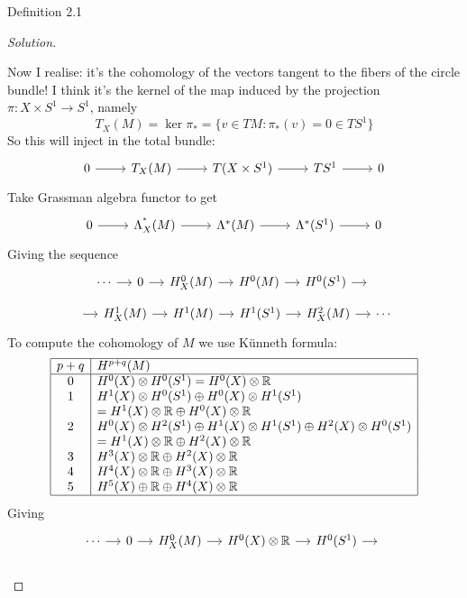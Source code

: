 \begin{thing3}{Definition 2.1}
\begin{proof}[Solution]
\begin{enumerate}
Now I realise: it's the cohomology of the vectors tangent to the fibers of the circle bundle! I think it's the kernel of the map induced by the projection \(\pi:X \times S^1 \to S^1\), namely
\[T_X(M)=\ker \pi_*=\{v \in TM: \pi_*(v)=0\in TS^1\}\]
So this will inject in the total bundle:
\[\begin{tikzcd}0\arrow[r]&T_X(M)\arrow[r]&T(X \times S^1)\arrow[r]&TS^1\arrow[r]&0\end{tikzcd}\]
Take Grassman algebra functor to get
\[\begin{tikzcd}0\arrow[r]&\Lambda^{^*}_X(M)\arrow[r]&\Lambda^{*}(M)\arrow[r]&\Lambda^{*}(S^1)\arrow[r]&0\end{tikzcd}\]
Giving the sequence
\[\begin{tikzcd}[column sep=small]
	\cdots\arrow[r]&0\arrow[r]&H^{0}_X(M)\arrow[r]&H^{0}(M)\arrow[r]&H^{0}(S^1)\arrow[r]&\leavevmode
\end{tikzcd}\]
\[\begin{tikzcd}[column sep=small]
	\leavevmode\arrow[r]&H^{1}_X(M)\arrow[r]&H^{1}(M)\arrow[r]&H^{1}(S^1)\arrow[r]&H^{2}_X(M)\arrow[r]&\cdots
\end{tikzcd}\]
To compute the cohomology of \(M\) we use Künneth formula:
\[
\begin{array}{|c|l|}
\hline
p+q & H^{p+q}(M) \\
\hline
0 & H^0(X) \otimes H^0(S^1) = H^0(X) \otimes \mathbb{R} \\
1 & H^1(X) \otimes H^0(S^1) \oplus H^0(X) \otimes H^1(S^1) \\
  & = H^1(X) \otimes \mathbb{R} \oplus H^0(X) \otimes \mathbb{R} \\
2 & H^0(X) \otimes H^2(S^1) \oplus H^1(X) \otimes H^1(S^1) \oplus H^2(X) \otimes H^0(S^1) \\
  & = H^1(X) \otimes \mathbb{R} \oplus H^2(X) \otimes \mathbb{R} \\
3 & H^3(X) \otimes \mathbb{R} \oplus H^2(X) \otimes \mathbb{R} \\
4 & H^4(X) \otimes \mathbb{R} \oplus H^3(X) \otimes \mathbb{R} \\
5 & H^5(X) \oplus \mathbb{R} \oplus H^4(X) \otimes \mathbb{R} \\
\hline
\end{array}
\]
Giving
\[\begin{tikzcd}[column sep=small]
	\cdots\arrow[r]&0\arrow[r]&H^{0}_X(M)\arrow[r]&H^{0}(X) \otimes \mathbb{R}\arrow[r]&H^{0}(S^1)\arrow[r]&\leavevmode
\end{tikzcd}\]
\[\begin{tikzcd}[column sep=small]

\end{tikzcd}\]
\end{enumerate}
\end{proof}
\end{thing3}
